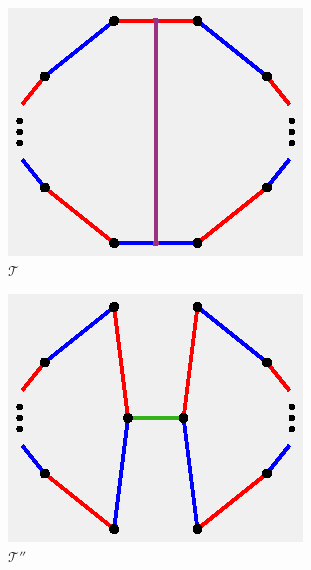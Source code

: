 \documentclass[11pt, oneside]{amsart}
\theoremstyle{theorem}
\theoremstyle{definition}
\newcommand{\T}{\mathcal{T}}
\theoremstyle{theorem}
\begin{document}
\begin{figure}[h!]
\begin{subfigure}{.24\textwidth}
  \centering
  \includegraphics[width=.9\linewidth]{perturb1.eps}
  \caption{$\T$}
  \label{lem1}
\end{subfigure}%
\begin{subfigure}{.24\textwidth}
  \centering
  \includegraphics[width=.9\linewidth]{perturb2.eps}
  \caption{$\T''$}
  \label{lem2}
\end{subfigure}
\begin{subfigure}{.24\textwidth}
  \centering

\end{subfigure}
\end{figure}
\end{document}
